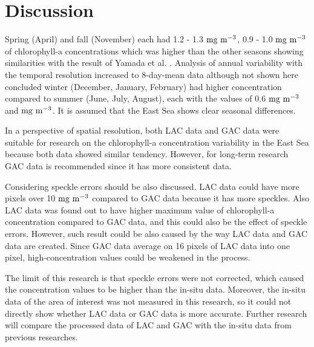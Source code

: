 \section{Discussion}

Spring (April) and fall (November) each had 1.2 - 1.3 $\rm mg~m^{-3}$, 0.9 - 1.0 $\rm mg~m^{-3}$ of chlorophyll-a concentrations which was higher than the other seasons showing similarities with the result of Yamada et al. \cite{yamada2004seasonal}. Analysis of annual variability with the temporal resolution increased to 8-day-mean data although not shown here concluded winter (December, January, February) had higher concentration compared to summer (June, July, August), each with the values of 0.6 $\rm mg~m^{-3}$ and $\rm mg~m^{-3}$. It is assumed that the East Sea shows clear seasonal differences.

In a perspective of spatial resolution, both LAC data and GAC data were suitable for research on the chlorophyll-a concentration variability in the East Sea because both data showed similar tendency. However, for long-term research GAC data is recommended since it has more consistent data. 

Considering speckle errors should be also discussed. LAC data could have more pixels over 10 $\rm mg~m^{-3}$ compared to GAC data because it has more speckles. Also LAC data was found out to have higher maximum value of chlorophyll-a concentration compared to GAC data, and this could also be the effect of speckle errors. However, such result could be also caused by the way LAC data and GAC data are created. Since GAC data average on 16 pixels of LAC data into one pixel, high-concentration values could be weakened in the process. 

The limit of this research is that speckle errors were not corrected, which caused the concentration values to be higher than the in-situ data. Moreover, the in-situ data of the area of interest was not measured in this research, so it could not directly show whether LAC data or GAC data is more accurate. Further research will compare the processed data of LAC and GAC with the in-situ data from previous researches.
